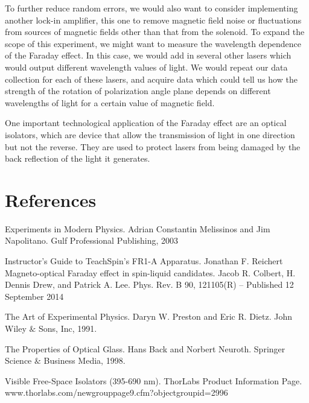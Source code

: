 \documentclass[prb,preprint]{revtex4-1}
\begin{document}
{To further reduce random errors, we would also want to consider implementing another lock-in amplifier, this one to remove magnetic field noise or fluctuations from sources of magnetic fields other than that from the solenoid.  To expand the scope of this experiment, we might want to measure the wavelength dependence of the Faraday effect.  In this case, we would add in several other lasers which would output different wavelength values of light.  We would repeat our data collection for each of these lasers, and acquire data which could tell us how the strength of the rotation of polarization angle plane depends on different wavelengths of light for a certain value of magnetic field.

One important technological application of the Faraday effect are an optical isolators, which are device that allow the transmission of light in one direction but not the reverse. They are used to protect lasers from being damaged by the back reflection of the light it generates\cite{optical}.


}

\section{References}

\begin{thebibliography}{4}
 Experiments in Modern Physics.  Adrian Constantin Melissinos and Jim Napolitano.  Gulf Professional Publishing, 2003

Instructor's Guide to TeachSpin's FR1-A Apparatus.  Jonathan F. Reichert
Magneto-optical Faraday effect in spin-liquid candidates.  Jacob R. Colbert, H. Dennis Drew, and Patrick A. Lee.  Phys. Rev. B 90, 121105(R) – Published 12 September 2014

The Art of Experimental Physics.  Daryn W. Preston and Eric R. Dietz.  John Wiley  $\&$ Sons, Inc, 1991.

 The Properties of Optical Glass.  Hans Back and Norbert Neuroth.  Springer Science $\&$ Business Media, 1998.

 Visible Free-Space Isolators (395-690 nm).  ThorLabs Product Information Page.  www.thorlabs.com/newgrouppage9.cfm?objectgroupid=2996







\end{thebibliography}
\end{document}
